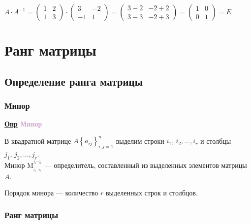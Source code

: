 \documentclass[12pt, a4paper]{report}
\newcommand{\df}[1][]{\begin{flushleft}\textbf{\underline{Опр} \textcolor{Plum}{#1}}\end{flushleft}}
\newcommand{\inlineperm}[3][i]{{#1}_{#2}\dotsb{#1}_{#3}}
\begin{document}
	\bigskip\(A\cdot A^{-1}=\begin{pmatrix}1&2\\1&3\end{pmatrix}\cdot\begin{pmatrix}3&-2\\-1&1\end{pmatrix}=\begin{pmatrix}3-2&-2+2\\3-3&-2+3\end{pmatrix}=\begin{pmatrix}1&0\\0&1\end{pmatrix}=E\)
	
	\chapter{Ранг матрицы}
	\section{Определение ранга матрицы}
	\subsection{Минор}
	\df[Минор]
	
	В квадратной матрице \(A\left\{a_{ij}\right\}_{i,j=1}^{n}\) выделим строки \(i_1,\,i_2,\dotsc,i_r\) и столбцы \(j_1,\,j_2,\dotsc,j_r\).\\Минор \(\mathrm{M}_{_{\inlineperm{1}{r}}}^{^{\inlineperm[j]{1}{r}}}\) --- определитель, составленный из выделенных элементов матрицы \(A\).
	
	\bigskip Порядок минора --- количество \(r\) выделенных строк и столбцов.
	\subsection{Ранг матрицы}
\end{document}
